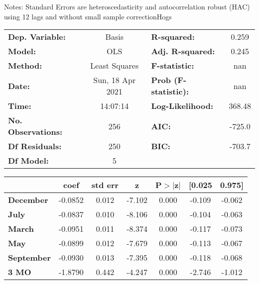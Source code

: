 Notes: \newline
 [1] Standard Errors are heteroscedasticity and autocorrelation robust (HAC) using 12 lags and without small sample correctionHogs\begin{center}
\begin{tabular}{lclc}
\toprule
\textbf{Dep. Variable:}    &      Basis       & \textbf{  R-squared:         } &     0.259   \\
\textbf{Model:}            &       OLS        & \textbf{  Adj. R-squared:    } &     0.245   \\
\textbf{Method:}           &  Least Squares   & \textbf{  F-statistic:       } &       nan   \\
\textbf{Date:}             & Sun, 18 Apr 2021 & \textbf{  Prob (F-statistic):} &      nan    \\
\textbf{Time:}             &     14:07:14     & \textbf{  Log-Likelihood:    } &    368.48   \\
\textbf{No. Observations:} &         256      & \textbf{  AIC:               } &    -725.0   \\
\textbf{Df Residuals:}     &         250      & \textbf{  BIC:               } &    -703.7   \\
\textbf{Df Model:}         &           5      & \textbf{                     } &             \\
\bottomrule
\end{tabular}
\begin{tabular}{lcccccc}
                   & \textbf{coef} & \textbf{std err} & \textbf{z} & \textbf{P$> |$z$|$} & \textbf{[0.025} & \textbf{0.975]}  \\
\midrule
\textbf{December}  &      -0.0852  &        0.012     &    -7.102  &         0.000        &       -0.109    &       -0.062     \\
\textbf{July}      &      -0.0837  &        0.010     &    -8.106  &         0.000        &       -0.104    &       -0.063     \\
\textbf{March}     &      -0.0951  &        0.011     &    -8.374  &         0.000        &       -0.117    &       -0.073     \\
\textbf{May}       &      -0.0899  &        0.012     &    -7.679  &         0.000        &       -0.113    &       -0.067     \\
\textbf{September} &      -0.0930  &        0.013     &    -7.395  &         0.000        &       -0.118    &       -0.068     \\
\textbf{3 MO}      &      -1.8790  &        0.442     &    -4.247  &         0.000        &       -2.746    &       -1.012     \\

\end{tabular}
\end{center}
